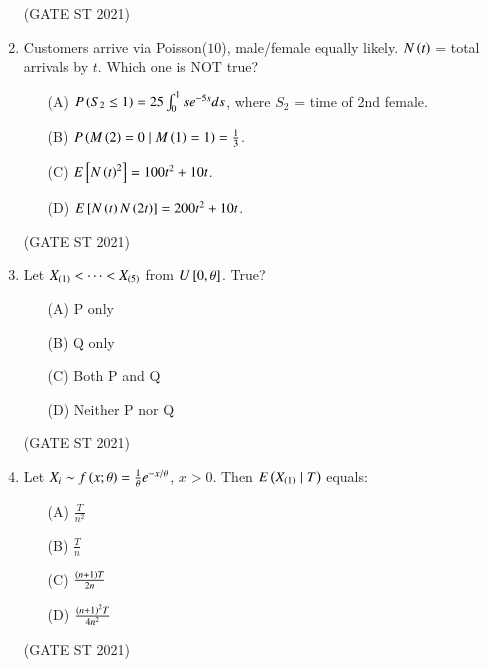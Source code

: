 \documentclass[journal,12pt,onecolumn]{IEEEtran}
\theoremstyle{remark}
\begin{document}
\begin{enumerate}
\hfill (GATE ST 2021) \\

\item
Customers arrive via Poisson($10$), male/female equally likely. $N\left(t\right)$ = total arrivals by $t$. Which one is NOT true?
\begin{enumerate}
\item[(A)] $P\left(S_2 \le 1\right) = 25 \int_0^1 s e^{-5s} ds$, where $S_2$ = time of 2nd female.
\item[(B)] $P\left(M\left(2\right) = 0 \mid M\left(1\right) = 1\right) = \frac13$.
\item[(C)] $E{}\left[N\left(t\right)^2\right]= 100t^2 + 10t$.
\item[(D)] $E{}\left[N\left(t\right)N\left(2t\right)\right] = 200t^2 + 10t$.
\end{enumerate}
\hfill (GATE ST 2021) \\

\item
Let $X_{\left(1\right)} < \dots < X_{\left(5\right)}$ from $U{}\left[0,\theta\right]$. True?
\begin{enumerate}
\item[(A)] P only
\item[(B)] Q only
\item[(C)] Both P and Q
\item[(D)] Neither P nor Q
\end{enumerate}
\hfill (GATE ST 2021) \\

\item
Let $X_i \sim f\left(x;\theta\right) = \frac{1}{\theta} e^{-x/\theta}$, $x>0$. Then $E\left(X_{\left(1\right)} \mid T\right)$ equals:
\begin{enumerate}
\item[(A)] $\frac{T}{n^2}$

\item[(B)] $\frac{T}{n}$
\item[(C)] $\frac{\left(n+1\right)T}{2n}$
\item[(D)] $\frac{\left(n+1\right)^2T}{4n^2}$
\end{enumerate}
\hfill (GATE ST 2021) \\


\end{enumerate}
\end{document}
